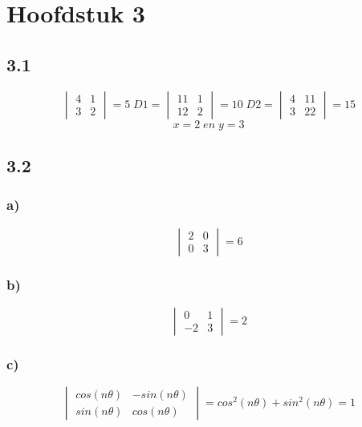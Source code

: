 \documentclass[11pt]{article}
\begin{document}
\section*{Hoofdstuk 3}
\subsection*{3.1}
\[
\begin{vmatrix}
4 & 1\\
3 & 2
\end{vmatrix}
= 5\;
D1 =
\begin{vmatrix}
11 & 1\\
12 & 2
\end{vmatrix}
= 10\;
D2 =
\begin{vmatrix}
4 & 11\\
3 & 22
\end{vmatrix}
=15
\]
\[
x = 2 \;en\; y = 3
\]
\subsection*{3.2}
\subsubsection*{a)}
\[
\begin{vmatrix}
2 & 0 \\
0 & 3
\end{vmatrix}
=6
\]

\subsubsection*{b)}
\[
\begin{vmatrix}
0 & 1\\
-2 & 3
\end{vmatrix}
=2
\]

\subsubsection*{c)}
\[
\begin{vmatrix}
cos(n\theta) & -sin(n\theta) \\
sin(n\theta) & cos(n\theta)
\end{vmatrix}
=cos^2(n\theta) + sin^2(n\theta) =1
\]
\end{document}
